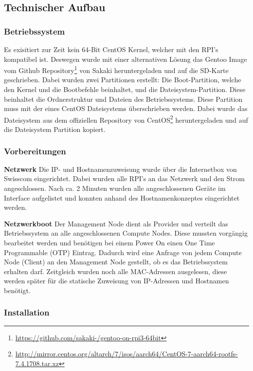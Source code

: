 \subsection{Technischer Aufbau}
\subsubsection{Betriebssystem}
Es exisitiert zur Zeit kein 64-Bit CentOS Kernel, welcher mit den RPI's kompatibel ist. Deswegen wurde mit einer alternativen Lösung das Gentoo Image vom Github Repository\footnote{\url{https://github.com/sakaki-/gentoo-on-rpi3-64bit}} von Sakaki heruntergeladen und auf die SD-Karte geschrieben. Dabei wurden zwei Partitionen erstellt: Die Boot-Partition, welche den Kernel und die Bootbefehle beinhaltet, und die Dateisystem-Partition. Diese beinhaltet die Ordnerstruktur und Dateien des Betriebssystems. Diese Partition muss mit der eines CentOS Dateisystems überschrieben werden. Dabei wurde das Dateisystem aus dem offiziellen Repository von CentOS\footnote{\url{http://mirror.centos.org/altarch/7/isos/aarch64/CentOS-7-aarch64-rootfs-7.4.1708.tar.xz}} heruntergeladen und auf die Dateisystem Partition kopiert.

\subsubsection{Vorbereitungen}
\textbf{Netzwerk}\newline
Die IP- und Hostnamenzuweisung wurde über die Internetbox von Swisscom eingerichtet. Dabei wurden alle RPI's an das Netzwerk und den Strom angeschlossen. Nach ca. 2 Minuten wurden alle angeschlossenen Geräte im Interface aufgelistet und konnten anhand des Hostnamenkonzeptes eingerichtet werden.

\textbf{Netzwerkboot}\newline
Der Management Node dient als Provider und verteilt das Betriebssystem an alle angeschlossenen Compute Nodes. Diese mussten vorgängig bearbeitet werden und benötigen bei einem Power On einen One Time Programmable (OTP) Eintrag. Dadurch wird eine Anfrage von jedem Compute Node (Client) an den Management Node gestellt, ob es das Betriebssystem erhalten darf. Zeitgleich wurden noch alle MAC-Adressen ausgelesen, diese werden später für die statische Zuweisung von IP-Adressen und Hostnamen benötigt.

\subsubsection{Installation}

